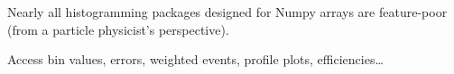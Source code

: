 \documentclass[aspectratio=169]{beamer}
\begin{document}
\begin{frame}{}
\Large
\vspace{1.25 cm}

Nearly all histogramming packages designed for Numpy arrays are feature-poor (from a particle physicist's perspective).

\begin{center}
\end{center}

\Large
Access bin values, errors, weighted events, profile plots, \mbox{efficiencies\ldots\hspace{-1 cm}}
\end{frame}
\end{document}
